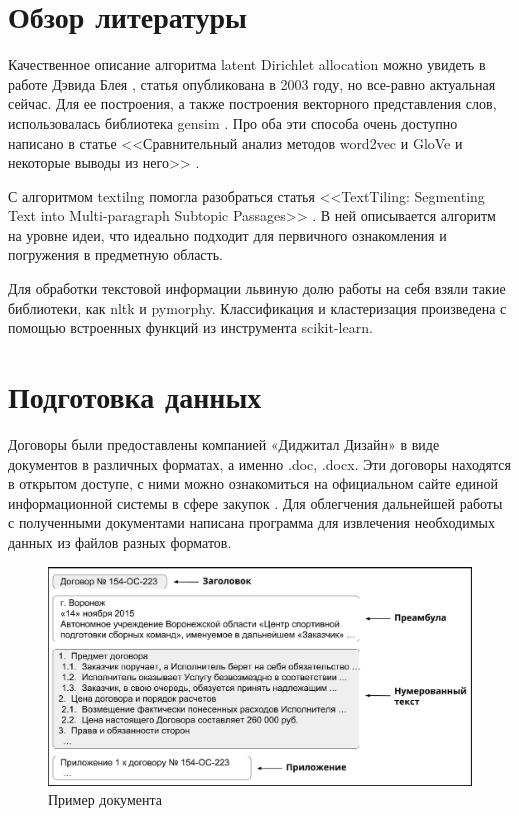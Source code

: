 \documentclass[12pt]{article}
\newcounter{c_tab}
\begin{document}
\newpage
\section{Обзор литературы}
Качественное описание алгоритма latent Dirichlet allocation можно увидеть в работе Дэвида Блея \cite{lda}, статья опубликована в 2003 году, но все-равно актуальная сейчас. Для ее построения, а также построения векторного представления слов, использовалась библиотека gensim \cite{gensim}. Про оба эти способа очень доступно написано в статье <<Сравнительный анализ методов word2vec и GloVe и некоторые выводы из него>> \cite{maslovskaya}.

С алгоритмом textilng помогла разобраться статья <<TextTiling: \linebreak Segmenting Text into Multi-paragraph Subtopic Passages>> \cite{texttiling}. В ней описывается алгоритм на уровне идеи, что идеально подходит для первичного ознакомления и погружения в предметную область. 

Для обработки текстовой информации львиную долю работы на себя взяли такие библиотеки, как nltk и pymorphy. Классификация и кластеризация произведена с помощью встроенных функций из инструмента scikit-learn.


\newpage
\section{Подготовка данных}
Договоры были предоставлены компанией «Диджитал Дизайн» \cite{dd} в виде документов в различных форматах, а именно .doc, .docx. Эти договоры находятся в открытом доступе, с ними можно ознакомиться на официальном сайте единой информационной системы в сфере закупок \cite{zakupki}. Для облегчения дальнейшей работы с полученными документами написана программа для извлечения необходимых данных из файлов разных форматов. 

\vspace{5pt}
\begin{figure}[h]
	\includegraphics[scale=0.74]{images/im1.eps}
	\caption{Пример документа}
	\label{im1}
\end{figure}
\vspace{5pt}
\end{document}
